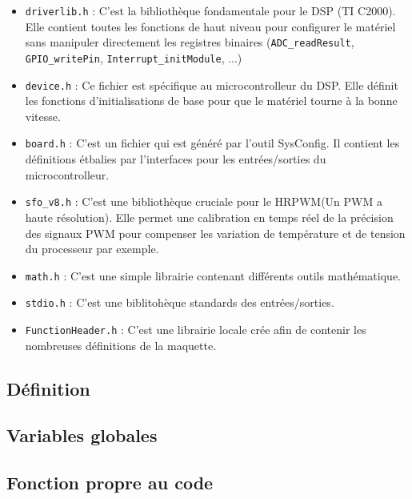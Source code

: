 \begin{itemize}
    \item \texttt{driverlib.h} : C'est la bibliothèque fondamentale pour le DSP (TI C2000). Elle contient toutes les fonctions de haut niveau pour configurer le matériel sans manipuler directement les registres binaires (\texttt{ADC\_readResult}, \texttt{GPIO\_writePin}, \texttt{Interrupt\_initModule}, ...)

    \item \texttt{device.h} : Ce fichier est spécifique au microcontrolleur du DSP. Elle définit les fonctions d'initialisations de base pour que le matériel tourne à la bonne vitesse.

    \item \texttt{board.h} : C'est un fichier qui est généré par l'outil SysConfig. Il contient les définitions étbalies par l'interfaces pour les entrées/sorties du microcontrolleur.

    \item \texttt{sfo\_v8.h} : C'est une bibliothèque cruciale pour le HRPWM(Un PWM a haute résolution). Elle permet une calibration en temps réel de la précision des signaux PWM pour compenser les variation de température et de tension du processeur par exemple.

    \item \texttt{math.h} : C'est une simple librairie contenant différents outils mathématique.

    \item \texttt{stdio.h} :  C'est une biblitohèque standards des entrées/sorties.

    \item \texttt{FunctionHeader.h} :  C'est une librairie locale crée afin de contenir les nombreuses définitions de la maquette.
\end{itemize}

\subsection{Définition}


\subsection{Variables globales}

\subsection{Fonction propre au code}

